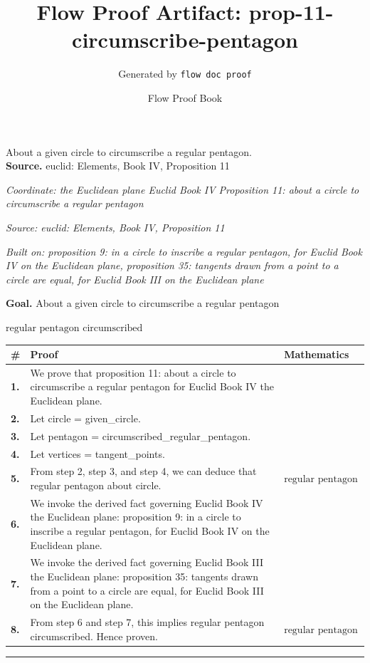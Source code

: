 \documentclass[11pt]{article}
\title{Flow Proof Artifact: prop-11-circumscribe-pentagon}
\author{Generated by \texttt{flow doc proof}}
\date{Flow Proof Book}
\theoremstyle{definition}
\begin{document}
\maketitle
About a given circle to circumscribe a regular pentagon.\\[0.5em]
\textbf{Source.} euclid: Elements, Book IV, Proposition 11\\[0.5em]
\bigskip
{}\par
\smallskip\noindent\textit{Coordinate: the Euclidean plane \cdot Euclid Book IV \cdot Proposition 11: about a circle to circumscribe a regular pentagon}\par
\smallskip\noindent\textit{Source: euclid: Elements, Book IV, Proposition 11}\par
\smallskip\noindent\textit{Built on: proposition 9: in a circle to inscribe a regular pentagon, for Euclid Book IV on the Euclidean plane, proposition 35: tangents drawn from a point to a circle are equal, for Euclid Book III on the Euclidean plane}\par
\medskip
\noindent\textbf{Goal.} About a given circle to circumscribe a regular pentagon\par
\noindent$\displaystyle \text{regular pentagon circumscribed}$\par
\medskip
\noindent
\begin{tabular}{@{} >{\raggedright\arraybackslash}p{} >{\raggedright\arraybackslash}p{} >{\raggedleft\arraybackslash}p{} @{}}
\textbf{\#} & \textbf{Proof} & \textbf{Mathematics} \\
\midrule
\textbf{1.} & We prove that proposition 11: about a circle to circumscribe a regular pentagon for Euclid Book IV the Euclidean plane. & \\[0.45em]
\textbf{2.} & Let circle = given\_circle. & \\[0.45em]
\textbf{3.} & Let pentagon = circumscribed\_regular\_pentagon. & \\[0.45em]
\textbf{4.} & Let vertices = tangent\_points. & \\[0.45em]
\textbf{5.} & From step 2, step 3, and step 4, we can deduce that regular pentagon about circle. & $\displaystyle \text{regular pentagon about circle}$ \\[0.45em]
\textbf{6.} & We invoke the derived fact governing Euclid Book IV the Euclidean plane: proposition 9: in a circle to inscribe a regular pentagon, for Euclid Book IV on the Euclidean plane. & \\[0.45em]
\textbf{7.} & We invoke the derived fact governing Euclid Book III the Euclidean plane: proposition 35: tangents drawn from a point to a circle are equal, for Euclid Book III on the Euclidean plane. & \\[0.45em]
\textbf{8.} & From step 6 and step 7, this implies regular pentagon circumscribed. Hence proven. & $\displaystyle \text{regular pentagon circumscribed}$ \\[0.45em]
\bottomrule
\end{tabular}
\label{thm:Geometry-Euclid Book IV-proposition_11_about_a_circle_to_circumscribe_a_regular_pentagon}
\par\medskip\hrule
\end{document}
